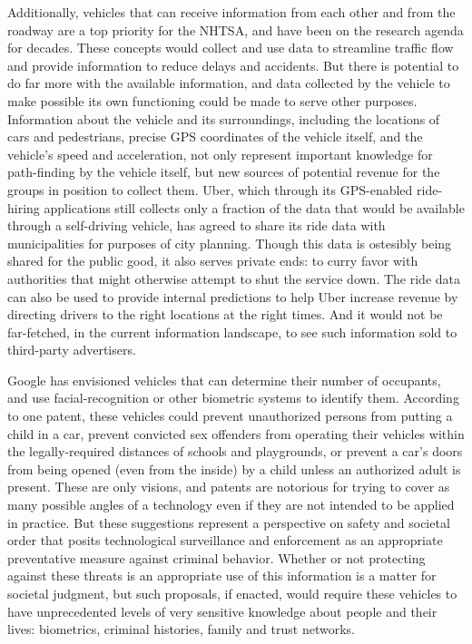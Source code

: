 Additionally, vehicles that can receive information from each other and from the
roadway are a top priority for the NHTSA, and have been on the
research agenda for decades.\cite[p. 11]{wetmore} These concepts would
collect and use data to streamline traffic flow and provide
information to reduce delays and accidents. But there is potential to
do far more with the available information,
and data collected by the vehicle to make possible its own functioning
could be made to serve other purposes. Information about the vehicle
and its surroundings, including the locations of cars and pedestrians,
precise GPS coordinates of the vehicle itself, and the vehicle's speed
and acceleration, not only represent important knowledge for
path-finding by the vehicle itself, but new sources of potential
revenue for the groups in position to collect them. Uber, which
through its GPS-enabled ride-hiring applications still collects only a
fraction of the data that would be available through a self-driving
vehicle, has agreed to share its ride data with municipalities for purposes of
city planning.\cite{uberJardin} Though this data is ostesibly being
shared for the public good, it also serves private ends: to curry favor with
authorities that might otherwise attempt to shut the service down. The
ride data can also be used to provide internal predictions to help
Uber increase revenue by directing drivers to the right locations at
the right times. And it would not be far-fetched, in the current
information landscape, to see such information sold to third-party advertisers.

Google has envisioned vehicles that can determine their number of
occupants, and use facial-recognition or other biometric systems to
identify them. According to one patent,\cite{predictPatent} these vehicles could prevent
unauthorized persons from putting a child in a car, prevent convicted
sex offenders from operating their vehicles within the
legally-required distances of schools and playgrounds, or prevent a
car's doors from being opened (even from the inside) by a child unless
an authorized adult is present. These are only visions, and patents
are notorious for trying to cover as many possible angles of a
technology even if they are not intended to be applied in practice.
But these suggestions represent a perspective on safety and societal
order that posits technological surveillance and enforcement as an
appropriate preventative measure against criminal behavior. Whether or not protecting
against these threats is an appropriate use of this information is a
matter for societal judgment, but such proposals, if enacted, would
require these vehicles to have unprecedented levels of very sensitive
knowledge about people and their lives: biometrics, criminal
histories, family and trust networks. 

